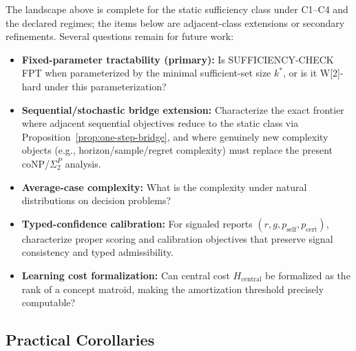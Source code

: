 The landscape above is complete for the static sufficiency class under C1--C4 and the declared regimes; the items below are adjacent-class extensions or secondary refinements.
Several questions remain for future work:
\begin{itemize}
\item \textbf{Fixed-parameter tractability (primary):} Is SUFFICIENCY-CHECK FPT when parameterized by the minimal sufficient-set size $k^*$, or is it W[2]-hard under this parameterization?
\item \textbf{Sequential/stochastic bridge extension:} Characterize the exact frontier where adjacent sequential objectives reduce to the static class via Proposition~\ref{prop:one-step-bridge}, and where genuinely new complexity objects (e.g., horizon/sample/regret complexity) must replace the present coNP/\(\Sigma_2^P\) analysis.
\item \textbf{Average-case complexity:} What is the complexity under natural distributions on decision problems?
\item \textbf{Typed-confidence calibration:} For signaled reports $(r,g,p_{\mathrm{self}},p_{\mathrm{cert}})$, characterize proper scoring and calibration objectives that preserve signal consistency and typed admissibility.
\item \textbf{Learning cost formalization:} Can central cost $H_{\text{central}}$ be formalized as the rank of a concept matroid, making the amortization threshold precisely computable?
\end{itemize}

\subsection*{Practical Corollaries}


